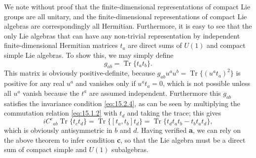 We note without proof that the finite-dimensional representations of compact Lie
groups are all unitary, and the finite-dimensional representations of compact Lie
algebras are correspondingly all Hermitian. Furthermore, it is easy to see that
the only Lie algebras that can have any non-trivial representation by independent
finite-dimensional Hermitian matrices $t_a$ are direct sums of $U(1)$ and
compact simple Lie algebras. To show this, we may simply define
\[
 g_{ab}=\operatorname{Tr}\{t_a t_b\} .
\]
This matrix is obviously positive-definite, because
$g_{ab}u^a u^b=\operatorname{Tr}\{(u^a t_a)^2\}$
is positive for any real $u^a$ and vanishes only if $u^a t_a=0$,
which is not possible unless all $u^a$ vanish because the $t^a$ are
assumed independent. Furthermore this $g_{ab}$ satisfies the invariance
condition \eqref{eq:15.2.4}, as can be seen by multiplying the commutation
relation \eqref{eq:15.1.2} with $t_d$ and taking the trace; this gives
\[
 iC^c{}_{ab}\operatorname{Tr}\{t_c t_d\}
 =\operatorname{Tr}\{[t_a,t_b]t_d\}
 =\operatorname{Tr}\{t_d t_a t_b-t_b t_a t_d\} ,
\]
which is obviously antisymmetric in $b$ and $d$. Having verified
\textbf{a}, we can rely on the above theorem to infer condition \textbf{c}, so
that the Lie algebra must be a direct sum of compact simple and $U(1)$
subalgebras.

